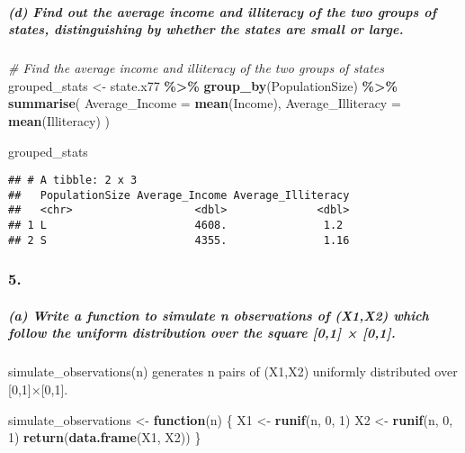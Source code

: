 \documentclass[
]{article}
\newenvironment{Shaded}{\begin{snugshade}}{\end{snugshade}}
\newcommand{\AttributeTok}[1]{\textcolor[rgb]{0.13,0.29,0.53}{#1}}
\newcommand{\CommentTok}[1]{\textcolor[rgb]{0.56,0.35,0.01}{\textit{#1}}}
\newcommand{\ControlFlowTok}[1]{\textcolor[rgb]{0.13,0.29,0.53}{\textbf{#1}}}
\newcommand{\DecValTok}[1]{\textcolor[rgb]{0.00,0.00,0.81}{#1}}
\newcommand{\FunctionTok}[1]{\textcolor[rgb]{0.13,0.29,0.53}{\textbf{#1}}}
\newcommand{\NormalTok}[1]{#1}
\newcommand{\OtherTok}[1]{\textcolor[rgb]{0.56,0.35,0.01}{#1}}
\newcommand{\SpecialCharTok}[1]{\textcolor[rgb]{0.81,0.36,0.00}{\textbf{#1}}}
\begin{document}
\subparagraph{(d) Find out the average income and illiteracy of the two
groups of states, distinguishing by whether the states are small or
large.}\label{d-find-out-the-average-income-and-illiteracy-of-the-two-groups-of-states-distinguishing-by-whether-the-states-are-small-or-large.}

\begin{Shaded}
\begin{Highlighting}[]
\CommentTok{\# Find the average income and illiteracy of the two groups of states}
\NormalTok{grouped\_stats }\OtherTok{\textless{}{-}}\NormalTok{ state.x77 }\SpecialCharTok{\%\textgreater{}\%} 
  \FunctionTok{group\_by}\NormalTok{(PopulationSize) }\SpecialCharTok{\%\textgreater{}\%} 
  \FunctionTok{summarise}\NormalTok{(}
    \AttributeTok{Average\_Income =} \FunctionTok{mean}\NormalTok{(Income),}
    \AttributeTok{Average\_Illiteracy =} \FunctionTok{mean}\NormalTok{(Illiteracy)}
\NormalTok{  )}

\NormalTok{grouped\_stats}
\end{Highlighting}
\end{Shaded}

\begin{verbatim}
## # A tibble: 2 x 3
##   PopulationSize Average_Income Average_Illiteracy
##   <chr>                   <dbl>              <dbl>
## 1 L                       4608.               1.2 
## 2 S                       4355.               1.16
\end{verbatim}

\subsubsection{5.}\label{section-4}

\subparagraph{(a) Write a function to simulate n observations of (X1,X2)
which follow the uniform distribution over the square {[}0,1{]} ×
{[}0,1{]}.}\label{a-write-a-function-to-simulate-n-observations-of-x1x2-which-follow-the-uniform-distribution-over-the-square-01-01.}

simulate\_observations(n) generates n pairs of (X1,X2) uniformly
distributed over {[}0,1{]}×{[}0,1{]}.

\begin{Shaded}
\begin{Highlighting}[]
\NormalTok{simulate\_observations }\OtherTok{\textless{}{-}} \ControlFlowTok{function}\NormalTok{(n) \{}
\NormalTok{  X1 }\OtherTok{\textless{}{-}} \FunctionTok{runif}\NormalTok{(n, }\DecValTok{0}\NormalTok{, }\DecValTok{1}\NormalTok{)}
\NormalTok{  X2 }\OtherTok{\textless{}{-}} \FunctionTok{runif}\NormalTok{(n, }\DecValTok{0}\NormalTok{, }\DecValTok{1}\NormalTok{)}
  \FunctionTok{return}\NormalTok{(}\FunctionTok{data.frame}\NormalTok{(X1, X2))}
\NormalTok{\}}
\end{Highlighting}
\end{Shaded}
\end{document}
